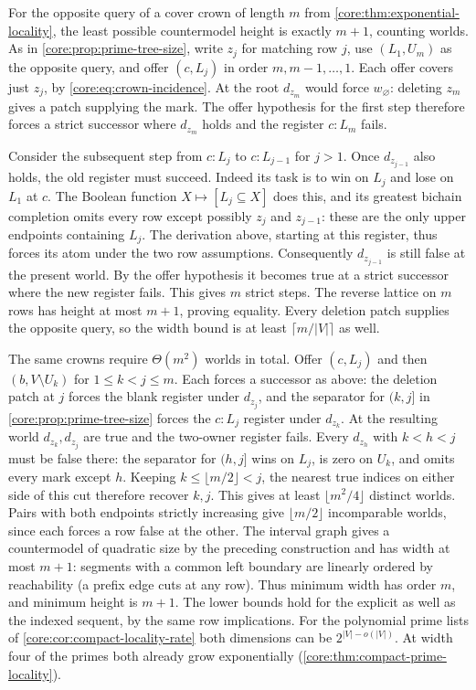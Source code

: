 For the opposite query of a cover crown of length $m$ from
\cref{core:thm:exponential-locality}, the least possible countermodel
height is exactly $m+1$, counting worlds. As in \cref{core:prop:prime-tree-size}, write $z_j$ for
matching row $j$, use $(L_1,U_m)$ as the opposite query, and offer
$(c,L_j)$ in order $m,m-1,\ldots,1$. Each offer covers just $z_j$,
by \eqref{core:eq:crown-incidence}. At the root $d_{z_m}$ would
force $w_\varnothing$: deleting $z_m$ gives a patch supplying the
mark. The offer hypothesis for the first step therefore forces a strict successor
where $d_{z_m}$ holds and the register $c:L_m$ fails.

Consider the subsequent step from $c:L_j$ to $c:L_{j-1}$ for $j>1$.
Once $d_{z_{j-1}}$ also holds, the old register must succeed.
Indeed its task is to win on $L_j$ and lose on $L_1$ at $c$.
The Boolean function $X\mapsto[L_j\subseteq X]$ does this, and its
greatest bichain completion omits every row except possibly $z_j$
and $z_{j-1}$: these are the only upper endpoints containing $L_j$.
The derivation above, starting at this register, thus forces its atom
under the two row assumptions. Consequently $d_{z_{j-1}}$ is still
false at the present world. By the offer hypothesis it becomes true
at a strict successor where the new register fails. This gives $m$
strict steps. The reverse lattice on $m$ rows has height at most
$m+1$, proving equality. Every deletion patch supplies the opposite
query, so the width bound is at least $\lceil m/|V|\rceil$ as well.

The same crowns require $\Theta(m^2)$ worlds in total. Offer
$(c,L_j)$ and then $(b,V\setminus U_k)$ for $1\le k<j\le m$. Each forces a successor as above:
the deletion patch at $j$ forces the blank register under $d_{z_j}$,
and the separator for $(k,j]$ in \cref{core:prop:prime-tree-size}
forces the $c:L_j$ register under $d_{z_k}$. At the resulting world
$d_{z_k},d_{z_j}$ are true and the two-owner register fails.
Every $d_{z_h}$ with $k<h<j$ must be false there: the separator
for $(h,j]$ wins on $L_j$, is zero on $U_k$, and omits every mark
except $h$. Keeping $k\le\lfloor m/2\rfloor<j$, the nearest true
indices on either side of this cut therefore recover $k,j$.
This gives at least $\lfloor m^2/4\rfloor$ distinct worlds.
Pairs with both endpoints strictly increasing give
$\lfloor m/2\rfloor$ incomparable worlds, since each forces a row
false at the other. The interval graph gives a countermodel of
quadratic size by the preceding construction and has width at most
$m+1$: segments with a common left boundary are linearly ordered by
reachability (a prefix edge cuts at any row).
Thus minimum width has order $m$, and minimum height is $m+1$.
The lower bounds hold for the explicit as well as the indexed
sequent, by the same row implications. For the polynomial prime
lists of \cref{core:cor:compact-locality-rate} both dimensions can
be $2^{|V|-o(|V|)}$. At width four of the primes both already grow
exponentially (\cref{core:thm:compact-prime-locality}).
